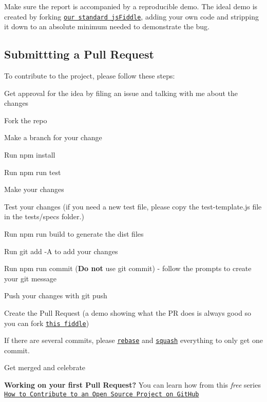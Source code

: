 Make sure the report is accompanied by a reproducible demo. The ideal demo is created by forking \href{http://jsfiddle.net/cwhgLcjv/}{\tt our standard js\+Fiddle}, adding your own code and stripping it down to an absolute minimum needed to demonstrate the bug.

\subsection*{Submittting a Pull Request}

To contribute to the project, please follow these steps\+:


\begin{DoxyEnumerate}
\item Get approval for the idea by filing an issue and talking with me about the changes
\item Fork the repo
\item Make a branch for your change
\item Run {\ttfamily npm install}
\item Run {\ttfamily npm run test}
\item Make your changes
\item Test your changes (if you need a new test file, please copy the {\ttfamily test-\/template.\+js} file in the tests/specs folder.)
\item Run {\ttfamily npm run build} to generate the dist files
\item Run {\ttfamily git add -\/A} to add your changes
\item Run {\ttfamily npm run commit} ({\bfseries Do not} use {\ttfamily git commit}) -\/ follow the prompts to create your git message
\item Push your changes with {\ttfamily git push}
\item Create the Pull Request (a demo showing what the PR does is always good so you can fork \href{http://jsfiddle.net/cwhgLcjv/}{\tt this fiddle})
\item If there are several commits, please \href{https://github.com/edx/edx-platform/wiki/How-to-Rebase-a-Pull-Request}{\tt rebase} and \href{https://github.com/edx/edx-platform/wiki/How-to-Rebase-a-Pull-Request#squash-your-changes}{\tt squash} everything to only get one commit.
\item Get merged and celebrate
\end{DoxyEnumerate}

{\bfseries Working on your first Pull Request?} You can learn how from this {\itshape free} series \href{https://egghead.io/series/how-to-contribute-to-an-open-source-project-on-github}{\tt How to Contribute to an Open Source Project on Git\+Hub} 